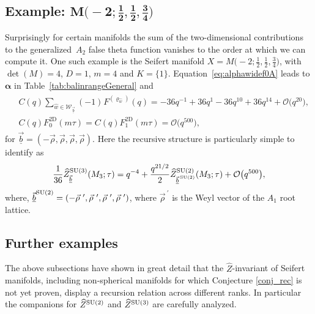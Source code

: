\documentclass[pdftex]{sigma}
\def\bal{\boldsymbol{\alpha}}
\theoremstyle{definition}
\numberwithin{equation}{section}
\begin{document}
\subsection[Example: $M(-2;1/2,1/2,3/4)]{Example: $\boldsymbol{M\bigl(-2;\frac{1}{2},\frac{1}{2},\frac{3}{4}\bigr)}$}

Surprisingly for certain manifolds the sum of the two-dimensional contributions to the generalized~$A_2$ false theta function vanishes to the order at which we can compute it. One such example is the Seifert manifold $X=M\bigl(-2; \frac{1}{2},\frac{1}{2},\frac{3}{4} \bigr)$, with $\det(M)=4$, $D=1$, $m=4$ and $K=\{1\}$. Equation~\eqref{eq:alphawidef0A} leads to $\bal$ in Table~\ref{tab:balinrangeGeneral} and
\begin{gather*}
\begin{split}
& C(q)\sum_{\hat{w}\in\mathcal W_{\vec{\underline{b}}}} ( -1 )^{}F^{ ( \varrho_{\hat{w}} )} ( q )={-}36 q^{-1} + 36q^{1} {-}36 q^{10} + 36 q^{14} + \mathcal{O} \bigl(q^{20} \bigr),\\
& C(q)F_{0}^{\text{2D}} (m\tau )= C(q)F_{1}^{\text{2D}} (m\tau ) = \mathcal{O} \bigl( q^{500} \bigr),
\end{split}
\end{gather*}
for $\vec{\underline{b}}=\left(-\vec\rho,\vec\rho,\vec\rho,\vec\rho\right)$. Here the recursive structure is particularly simple to identify as
\begin{equation*}
\frac{1}{36}\widehat{Z}^{{\rm SU}(3)}_{\vec{\underline{b}}}(M_3;\tau)=q^{-4}+\frac{q^{21/2}}{2}\widehat{Z}^{{\rm SU}(2)}_{\vec{\underline{b}}^{\, {\rm SU}(2)}}(M_3;\tau) + \mathcal{O}\bigl(q^{500}\bigr),
\end{equation*}
where, $\vec{\underline{b}}^{ {\rm SU}(2)}=\left(-\vec\rho^{\ \prime},\vec\rho^{\ \prime},\vec\rho^{\ \prime},\vec\rho^{\ \prime}\right)$, where $\vec{\rho}^{\ \prime}$ is the Weyl vector of the $A_1$ root lattice.

\subsection{Further examples}

The above subsections have shown in great detail that the $\widehat{Z}$-invariant of Seifert manifolds, including non-spherical manifolds for which Conjecture \ref{conj_rec} is not yet proven, display a recursion relation across different ranks. In particular the companions for $\widehat Z^{{\rm SU}(2)}$ and $\widehat Z^{{\rm SU}(3)}$ are carefully analyzed.
\end{document}
